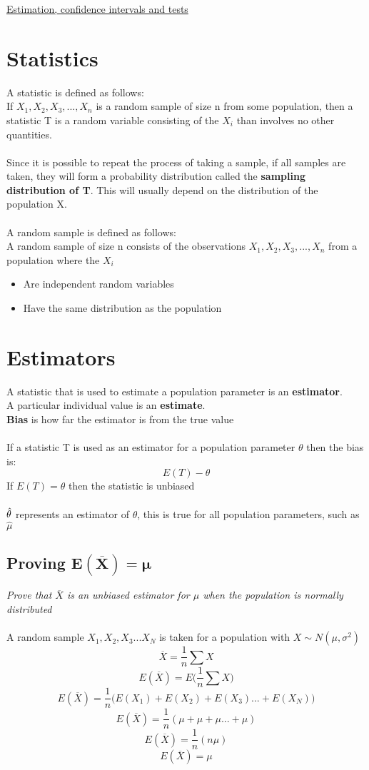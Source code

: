 \documentclass{article}[18pt]
\begin{document}
\begin{center}
\underline{\huge Estimation, confidence intervals and tests}
\end{center}
\section{Statistics}
A statistic is defined as follows:\\
If $X_1,X_2,X_3,...,X_n$ is a random sample of size n from some population, then a statistic T is a random variable consisting of the $X_i$ than involves no other quantities.\\
\\
Since it is possible to repeat the process of taking a sample, if all samples are taken, they will form a probability distribution called the \textbf{sampling distribution of T}. This will usually depend on the distribution of the population X.\\
\\
A random sample is defined as follows:\\
A random sample of size n consists of the observations $X_1,X_2,X_3,...,X_n$ from a population where the $X_i$
\begin{itemize}
\item Are independent random variables
\item Have the same distribution as the population
\end{itemize}


\section{Estimators}
A statistic that is used to estimate a population parameter is an \textbf{estimator}.\\
A particular individual value is an \textbf{estimate}.\\
\textbf{Bias} is how far the estimator is from the true value\\
\\
If a statistic T is used as an estimator for a population parameter $\theta$ then the bias is:
$$E(T)-\theta$$
If $E(T)=\theta$ then the statistic is unbiased\\
\\
{\large $\mathlarger{\hat{\theta}}$} represents an estimator of $\theta$, this is true for all population parameters, such as $\hat{\mu}$
\subsection{Proving $\mathbf{E(\overline{X})=\mu}$}
\textit{Prove that $\overline{X}$ is an unbiased estimator for $\mu$ when the population is normally distributed}\\
\\
A random sample $X_1,X_2,X_3...X_N$ is taken for a population with $X\sim N(\mu,\sigma^2)$
$$\overline{X}=\frac{1}{n}\sum X$$
$$E(\overline{X})=E\Big(\frac{1}{n}\sum X\Big)$$
$$E(\overline{X})=\frac{1}{n}\big(E(X_1)+E(X_2)+E(X_3)...+E(X_N)\big)$$
$$E(\overline{X})=\frac{1}{n}(\mu+\mu+\mu...+\mu)$$
$$E(\overline{X})=\frac{1}{n}(n\mu)$$
$$E(\overline{X})=\mu$$
\end{document}
